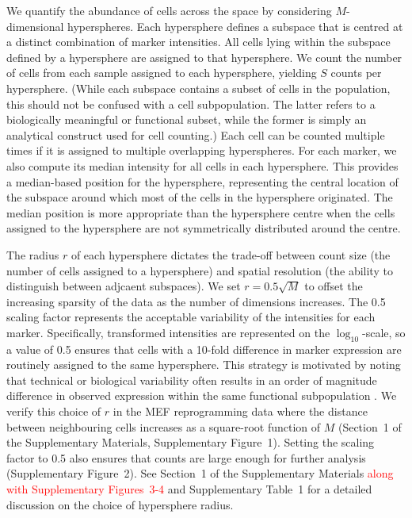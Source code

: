 \documentclass{article}
\newcommand\revised[1]{\textcolor{red}{#1}}
\newcommand{\supphyperradverify}{1}
\newcommand{\suppfighyperrad}{1}
\newcommand{\suppfighypertol}{2}
\newcommand{\suppfigradsim}{3-4}
\newcommand{\supptabparam}{1}
\begin{document}
We quantify the abundance of cells across the space by considering $M$-dimensional hyperspheres.
Each hypersphere defines a subspace that is centred at a distinct combination of marker intensities.
All cells lying within the subspace defined by a hypersphere are assigned to that hypersphere.
We count the number of cells from each sample assigned to each hypersphere, yielding $S$ counts per hypersphere.
(While each subspace contains a subset of cells in the population, this should not be confused with a cell subpopulation.
The latter refers to a biologically meaningful or functional subset, while the former is simply an analytical construct used for cell counting.)
Each cell can be counted multiple times if it is assigned to multiple overlapping hyperspheres.
For each marker, we also compute its median intensity for all cells in each hypersphere.
This provides a median-based position for the hypersphere, representing the central location of the subspace around which most of the cells in the hypersphere originated.
The median position is more appropriate than the hypersphere centre when the cells assigned to the hypersphere are not symmetrically distributed around the centre.


The radius $r$ of each hypersphere dictates the trade-off between count size (the number of cells assigned to a hypersphere) and spatial resolution (the ability to distinguish between adjcaent subspaces).
We set $r=0.5\sqrt{M}$ to offset the increasing sparsity of the data as the number of dimensions increases.
The 0.5 scaling factor represents the acceptable variability of the intensities for each marker.
Specifically, transformed intensities are represented on the $\log_{10}$-scale, so a value of 0.5 ensures that cells with a 10-fold difference in marker expression are routinely assigned to the same hypersphere.
This strategy is motivated by noting that technical or biological variability often results in an order of magnitude difference in observed expression within the same functional subpopulation \cite{ornatsky2008study,zunder2015continuous,zunder2015palladium}.
We verify this choice of $r$ in the MEF reprogramming data where the distance between neighbouring cells increases as a square-root function of $M$ (Section~\supphyperradverify{} of the Supplementary Materials, Supplementary Figure~\suppfighyperrad{}).
Setting the scaling factor to 0.5 also ensures that counts are large enough for further analysis (Supplementary Figure~\suppfighypertol{}).
See Section~\supphyperradverify{} of the Supplementary Materials \revised{along with Supplementary Figures~\suppfigradsim{}} and Supplementary Table~\supptabparam{} for a detailed discussion on the choice of hypersphere radius.
\end{document}
